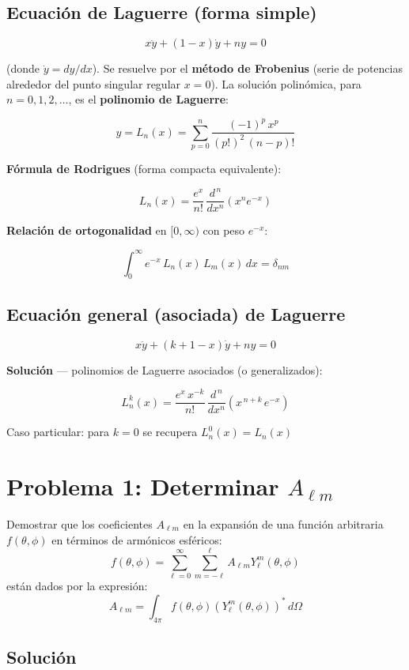 \documentclass[a4paper]{article}
\begin{document}
\subsection{Ecuación de Laguerre (forma simple)}


\[
x\ddot y+(1-x)\dot y+ny=0\tag{7}
\]


(donde $\dot y=dy/dx$). Se resuelve por el \textbf{método de Frobenius} (serie de potencias alrededor del punto singular regular $x=0$). La solución polinómica, para $n=0,1,2,\dots$, es el \textbf{polinomio de Laguerre}:

\[
y=L_n(x)=\sum_{p=0}^{n}\frac{(-1)^p\,x^p}{(p!)^2\,(n-p)!}\tag{8}
\]


\textbf{Fórmula de Rodrigues} (forma compacta equivalente):

\[
L_n(x)=\frac{e^{x}}{n!}\,\frac{d^{\,n}}{dx^{n}}\left(x^{n}e^{-x}\right)\tag{9}
\]


\textbf{Relación de ortogonalidad} en $[0,\infty)$ con peso $e^{-x}$:

\[
\int_0^\infty e^{-x}\,L_n(x)\,L_m(x)\,dx=\delta_{nm}
\]


\subsection{Ecuación general (asociada) de Laguerre}


\[
x\ddot y+(k+1-x)\dot y+ny=0\tag{10}
\]


\textbf{Solución} --- polinomios de Laguerre asociados (o generalizados):

\[
\boxed{L_n^{k}(x)=\frac{e^{x}\,x^{-k}}{n!}\,\frac{d^{\,n}}{dx^{n}}\left(x^{\,n+k}\,e^{-x}\right)}\tag{11}
\]


Caso particular: para $k=0$ se recupera $L_n^{0}(x)=L_n(x)$


\section{Problema 1: Determinar $A_{\ell m}$}
Demostrar que los coeficientes $A_{\ell m}$ en la expansión de una función arbitraria $f(\theta, \phi)$ en términos de armónicos esféricos:
$$f(\theta, \phi) = \sum_{\ell=0}^{\infty} \sum_{m=-\ell}^{\ell} A_{\ell m} Y_\ell^m(\theta, \phi)$$
están dados por la expresión:
$$A_{\ell m} = \int_{4\pi} f(\theta, \phi) (Y_\ell^m(\theta, \phi))^* \, d\Omega$$

\subsection{Solución}
\end{document}
